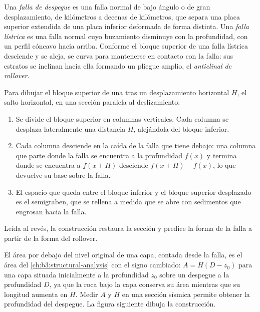 \begin{definition}\label{def:b3:extension-strike-slip:detachment}
Una \emph{falla de despegue} es una falla normal de bajo ángulo
o  de gran desplazamiento, de kilómetros a decenas de kilómetros, que
separa una placa superior extendida de una placa inferior deformada de forma distinta. Una
\emph{falla lístrica} es una falla normal cuyo buzamiento
disminuye con la profundidad, con un perfil cóncavo hacia arriba. Conforme el bloque superior
de una falla lístrica desciende y se aleja, se curva para mantenerse en contacto con la
falla: sus estratos se inclinan hacia ella formando un pliegue amplio, el \emph{anticlinal de
rollover}.
\end{definition}

\begin{method}\label{met:b3:extension-strike-slip:heave}
Para dibujar el bloque superior de una  tras un desplazamiento horizontal
$H$, el salto horizontal, en una sección paralela al deslizamiento:
\begin{enumerate}
  \item Se divide el bloque superior en columnas verticales. Cada columna se desplaza
        lateralmente una distancia $H$, alejándola del bloque inferior.
  \item Cada columna desciende en la caída de la falla que tiene debajo: una columna que
        parte donde la falla se encuentra a la profundidad $f(x)$ y termina donde se encuentra
        a $f(x + H)$ desciende $f(x + H) - f(x)$, lo que devuelve su base
        sobre la falla.
  \item El espacio que queda entre el bloque inferior y el bloque superior desplazado es el
        semigraben, que se rellena a medida que se abre con sedimentos que engrosan hacia la
        falla.
\end{enumerate}
Leída al revés, la construcción restaura la sección y predice la forma
de la falla a partir de la forma del rollover.
\end{method}

El área por debajo del nivel original de una capa, contada desde la falla, es
el área del \cref{ch:b3:structural-analysis} con el signo cambiado: $A =
H(D - z_0)$ para una capa situada inicialmente a la profundidad $z_0$ sobre un despegue
a la profundidad $D$, ya que la roca bajo la capa conserva su área mientras que su longitud aumenta
en $H$. Medir $A$ y $H$ en una sección sísmica permite obtener la profundidad del
despegue. La figura siguiente dibuja la construcción.

